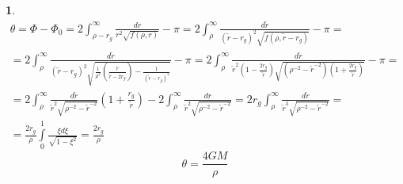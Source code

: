 \documentclass[12pt]{article}
\theoremstyle{definition}
\newtheorem{zad}{}[section]
\begin{document}
\begin{zad}
\begin{multline}
    \theta=\Phi-\Phi_0=2\int_{\rho-r_g}^\infty\frac{dr}{r^2\sqrt{f(\rho,r)}}-\pi=2\int_{\rho}^\infty\frac{d\tilde r}{(\tilde r-r_g)^2\sqrt{f(\rho,\tilde r-r_g)}}-\pi=\\=2\int_{\rho}^\infty\frac{d\tilde r}{(\tilde r-r_g)^2\sqrt{\frac{1}{\rho^2}\left(\frac{\tilde r}{\tilde r-2r_g}\right)-\frac{1}{(\tilde r-r_g)^2}}}-\pi=2\int_{\rho}^\infty\frac{d\tilde r}{\tilde r^2(1-\frac{2r_g}{\tilde r})\sqrt{(\rho^{-2}-\tilde r^{-2})\left(1+\frac{2r_g}{\tilde r}\right)}}-\pi=\\=2\int_{\rho}^\infty\frac{d\tilde r}{\tilde r^2\sqrt{\rho^{-2}-\tilde r^{-2}}}\left(1+\frac{r_g}{\tilde r}\right)-2\int_\rho^\infty\frac{dr}{\tilde{r}^2\sqrt{\rho^{-2}-\tilde{r}^{-2}}}=2r_g\int_{\rho}^\infty\frac{d\tilde r}{\tilde r^3\sqrt{\rho^{-2}-\tilde r^{-2}}}=\\=\frac{2r_g}{\rho}\int\limits_0^1\frac{\xi d\xi}{\sqrt{1-\xi^2}}=\frac{2r_g}{\rho}
\end{multline}
\begin{equation}
    \boxed{\theta=\frac{4GM}{\rho}}
\end{equation}
\end{zad}
\newpage
\end{document}
